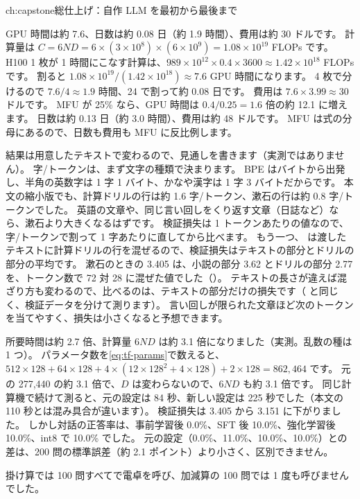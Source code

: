 \begin{answers}{ch:capstone}{総仕上げ：自作 LLM を最初から最後まで}
\item GPU 時間は約 7.6、日数は約 0.08 日（約 1.9 時間）、費用は約 30 ドルです。
計算量は $C=6ND=6\times(3\times10^{8})\times(6\times10^{9})=1.08\times10^{19}$ FLOPs です。
H100 1 枚が 1 時間にこなす計算は、$989\times10^{12}\times0.4\times3600\approx1.42\times10^{18}$ FLOPs です。
割ると $1.08\times10^{19}/(1.42\times10^{18})\approx7.6$ GPU 時間になります。
4 枚で分けるので $7.6/4\approx1.9$ 時間、24 で割って約 0.08 日です。
費用は $7.6\times3.99\approx30$ ドルです。
MFU が 25\% なら、GPU 時間は $0.4/0.25=1.6$ 倍の約 12.1 に増えます。
日数は約 0.13 日（約 3.0 時間）、費用は約 48 ドルです。
MFU は式の分母にあるので、日数も費用も MFU に反比例します。
\item 結果は用意したテキストで変わるので、見通しを書きます（実測ではありません）。
字/トークンは、まず文字の種類で決まります。
BPE はバイトから出発し、半角の英数字は 1 字 1 バイト、かなや漢字は 1 字 3 バイトだからです。
本文の縮小版でも、計算ドリルの行は約 1.6 字/トークン、漱石の行は約 0.8 字/トークンでした。
英語の文章や、同じ言い回しをくり返す文章（日誌など）なら、漱石より大きくなるはずです。
検証損失は 1 トークンあたりの値なので、字/トークンで割って 1 字あたりに直してから比べます。
もう一つ、 は渡したテキストに計算ドリルの行を混ぜるので、検証損失はテキストの部分とドリルの部分の平均です。
漱石のときの 3.405 は、小説の部分 3.62 とドリルの部分 2.77 を、トークン数で 72 対 28 に混ぜた値でした（）。
テキストの長さが違えば混ざり方も変わるので、比べるのは、テキストの部分だけの損失です（ と同じく、検証データを分けて測ります）。
言い回しが限られた文章ほど次のトークンを当てやすく、損失は小さくなると予想できます。
\item 所要時間は約 2.7 倍、計算量 $6ND$ は約 3.1 倍になりました（実測。乱数の種は 1 つ）。
パラメータ数を\eqref{eq:tf-params}で数えると、$512\times128+64\times128+4\times(12\times128^{2}+4\times128)+2\times128=862{,}464$ です。
元の 277,440 の約 3.1 倍で、$D$ は変わらないので、$6ND$ も約 3.1 倍です。
同じ計算機で続けて測ると、元の設定は 84 秒、新しい設定は 225 秒でした（本文の 110 秒とは混み具合が違います）。
検証損失は 3.405 から 3.151 に下がりました。
しかし対話の正答率は、事前学習後 0.0\%、SFT 後 10.0\%、強化学習後 10.0\%、int8 で 10.0\% でした。
元の設定（0.0\%、11.0\%、10.0\%、10.0\%）との差は、200 問の標準誤差（約 2.1 ポイント）より小さく、区別できません。
\item 掛け算では 100 問すべてで電卓を呼び、加減算の 100 問では 1 度も呼びませんでした。

\end{answers}
